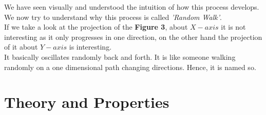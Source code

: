 \documentclass[12pt,a4paper]{article}%
\begin{document}
	\begin{flushleft}
		We have seen visually and understood the intuition of how this process develops. We now try to understand why this process is called \textit{'Random Walk'}.\\
		If we take a look at the projection of the \textbf{Figure 3}, about $X-axis$ it is not interesting as it only progresses in one direction, on the other hand the projection of it about $Y-axis$ is interesting.\\
		It basically oscillates randomly back and forth. It is like someone walking randomly on a one dimensional path changing directions. Hence, it is named so.
	\end{flushleft}
	\section{Theory and Properties}
\end{document}
